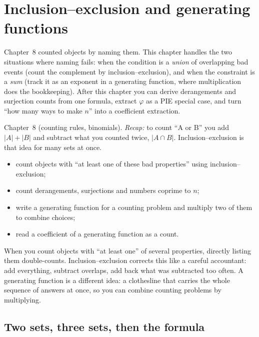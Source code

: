 \chapter{Inclusion--exclusion and generating functions}\label{ch:piegf}

Chapter~8 counted objects by naming them. This chapter handles the two
situations where naming fails: when the condition is a \emph{union}
of overlapping bad events (count the complement by
inclusion--exclusion), and when the constraint is a \emph{sum}
(track it as an exponent in a generating function, where multiplication
does the bookkeeping). After this chapter you can derive derangements
and surjection counts from one formula, extract $\varphi$ as a PIE
special case, and turn ``how many ways to make $n$'' into a coefficient
extraction.

\begin{rulebox}
Chapter~8 (counting rules, binomials). \emph{Recap:} to count ``A or B'' you add $|A|+|B|$ and subtract what you counted twice, $|A\cap B|$. Inclusion--exclusion is that idea for many sets at once.
\end{rulebox}
\begin{wins}
\begin{itemize}
\item count objects with ``at least one of these bad properties'' using inclusion--exclusion;
\item count derangements, surjections and numbers coprime to $n$;
\item write a generating function for a counting problem and multiply two of them to combine choices;
\item read a coefficient of a generating function as a count.
\end{itemize}
\end{wins}
\begin{principle}
When you count objects with ``at least one'' of several properties, directly listing them double-counts. Inclusion--exclusion corrects this like a careful accountant: add everything, subtract overlaps, add back what was subtracted too often. A generating function is a different idea: a clothesline that carries the whole sequence of answers at once, so you can combine counting problems by multiplying.
\end{principle}

\section{Two sets, three sets, then the formula}\label{sec:pie}

